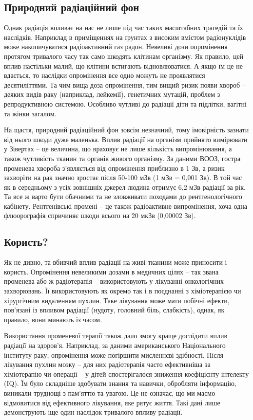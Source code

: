 \documentclass{article}
\begin{document}
\subsection{Природний радіаційний фон}

Однак радіація впливає на нас не лише під час таких масштабних трагедій та їх наслідків. Наприклад в приміщеннях на ґрунтах з високим вмістом радіонуклідів може накопичуватися радіоактивний газ радон. Невеликі дози опромінення протягом тривалого часу так само шкодять клітинам організму. Як правило, цей вплив настільки малий, що клітини встигають відновлюватися. А якщо їм це не вдається, то наслідки опромінення все одно можуть не проявлятися десятиліттями. Та чим вища доза опромінення, тим вищий ризик появи хвороб – деяких видів раку (наприклад, лейкемії), генетичних мутацій, проблем з репродуктивною системою. Особливо чутливі до радіації діти та підлітки, вагітні та жінки загалом.

На щастя, природний радіаційний фон зовсім незначний, тому імовірність зазнати від нього шкоди дуже маленька. Вплив радіації на організм прийнято вимірювати у Зівертах – це величина, що враховує не лише кількість випромінювання, а також чутливість тканин та органів живого організму. За даними ВООЗ, гостра променева хвороба з’являється від опромінення приблизно в 1 Зв, а ризик захворіти на рак значно зростає після 50-100 мЗв (1 мЗв = 0,001 Зв). В той час як в середньому з усіх зовнішніх джерел людина отримує 6,2 мЗв радіації за рік. Та все ж варто бути обачними та не зловживати походами до рентгенологічного кабінету. Рентгенівські промені – це також радіоактивне випромінення, хоча одна флюорографія спричиняє шкоди всього на 20 мкЗв (0,00002 Зв).

\subsection{Користь?}
Як не дивно, та вбивчий вплив радіації на живі тканини може приносити і користь. Опромінення невеликими дозами в медичних цілях – так звана променева або ж радіотерапія – використовують у лікуванні онкологічних захворювань. Її використовують як окремо так і в поєднанні з хіміотерапією чи хірургічним видаленням пухлин. Таке лікування може мати побічні ефекти, пов’язані із впливом радіації (нудоту, головний біль, слабкість), однак, як правило, вони минають із часом.

Використання променевої терапії також дало змогу краще дослідити вплив радіації на здоров’я. Наприклад, за даними американського Національного інституту раку, опромінення може погіршити мисленнєві здібності. Після лікування пухлин мозку – для них радіотерапія часто ефективніша за хіміотерапію чи операції – у дітей спостерігалося зниження коефіцієнту інтелекту (IQ). Їм було складніше здобувати знання та навички, обробляти інформацію, виникали труднощі з пам’яттю та увагою. Це не означає, що ми маємо відмовитися від ефективного лікування, яке рятує життя. Такі дані лише демонструють іще один наслідок тривалого впливу радіації.
\end{document}
